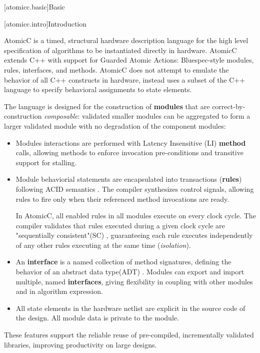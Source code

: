 [atomicc.basic]{Basic}

[atomicc.intro]{Introduction}

AtomicC is a timed, structural hardware description language for
the high level specification of algorithms to be instantiated
directly in hardware.
AtomicC extends C++
with support for Guarded Atomic Actions:
Bluespec-style\cite{Bluespec:www,Hoe:Thesis,HoeArvind:TRS_Synthesis2}
modules, rules, interfaces, and methods.
AtomicC does not attempt to emulate the behavior of all C++ constructs in hardware,
instead uses a subset of the C++ language to specify behavioral
assignments to state elements.

The language is designed for
the construction of \textbf{modules} that are correct-by-construction \textit{composable}:
validated smaller modules can be aggregated to form
a larger validated module with
no degradation of the component modules:
\begin{itemize}
\item Modules interactions are performed with Latency Insensitive (LI)
\cite{carloni2001theory}
\textbf{method} calls, allowing methods to enforce invocation pre-conditions
and transitive support for stalling.
\item Module behaviorial statements are encapsulated into transactions (\textbf{rules})
following ACID semantics
\cite{NikhilSemantics}
\cite{harris2005composable}
\cite{nurvitadhi2011automatic}
\cite{fox2003algebraic}.
The compiler synthesizes control signals, allowing rules to fire
only when their referenced method invocations are ready.

In AtomicC, all enabled rules in all modules execute on every clock cycle.
The compiler
validates that rules executed during a given clock cycle are
"sequentially consistent"(SC) \cite{Lamport:1979:MMC:1311099.1311750},
guaranteeing each rule executes
independently of any other rules executing at the same time
(\textit{isolation}\cite[Sec.~7.1]{GrayR93}).
\item An \textbf{interface} is a named collection of method signatures, defining
the behavior of an abstract data type(ADT) \cite{Liskov74programmingwith}.
Modules can export and import
multiple, named \textbf{interfaces},
giving flexibility in coupling with other modules and in algorithm expression.
\item All state elements in the hardware
netlist are explicit in the source code of the design.
All module data is private to the module.
\end{itemize}
These features support the reliable reuse of pre-compiled, incrementally validated
libraries, improving productivity on large designs.

